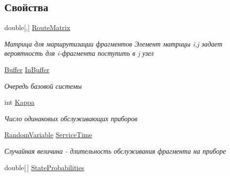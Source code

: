 \subsection*{Свойства}
\begin{DoxyCompactItemize}
\item 
double\mbox{[},\mbox{]} \hyperlink{class_network_simulator_1_1_service_node_a2e789a68c35295daa0c66b1cccf40247}{Route\+Matrix}
\begin{DoxyCompactList}\small\item\em Матрица для маршрутизации фрагментов Элемент матрицы i,j задает вероятность для i-\/фрагмента поступить в j узел \end{DoxyCompactList}\item 
\hyperlink{class_network_simulator_1_1_buffer}{Buffer} \hyperlink{class_network_simulator_1_1_service_node_ae4baae1147ffac6e43ab3c5917849473}{In\+Buffer}
\begin{DoxyCompactList}\small\item\em Очередь базовой системы \end{DoxyCompactList}\item 
int \hyperlink{class_network_simulator_1_1_service_node_a508a5abec3a03da2a2c98bd77d9f27e9}{Kappa}
\begin{DoxyCompactList}\small\item\em Число одинаковых обслуживающих приборов \end{DoxyCompactList}\item 
\hyperlink{class_random_variables_1_1_random_variable}{Random\+Variable} \hyperlink{class_network_simulator_1_1_service_node_ad8db6aa20ec8e8ab9f53268c3a90b05d}{Service\+Time}
\begin{DoxyCompactList}\small\item\em Случайная величина -\/ длительность обслуживания фрагмента на приборе \end{DoxyCompactList}\item 
double\mbox{[}$\,$\mbox{]} \hyperlink{class_network_simulator_1_1_service_node_a8fd15687cf3bbfc3e3e48b54d17c4d6e}{State\+Probabilities}

\end{DoxyCompactItemize}
